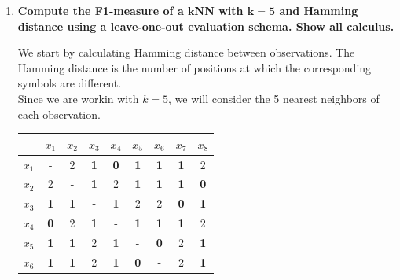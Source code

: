 \documentclass[12pt]{article}
\begin{document}
\vspace{10pt}
\begin{enumerate}[leftmargin=\labelsep]
    \item \textbf{Compute the F1-measure of a $\mathbf{k}$NN with $\mathbf{k =  5}$ and Hamming distance using a
    leave-one-out evaluation schema. Show all calculus.}

    \vspace{10pt}
    We start by calculating Hamming distance between observations. The Hamming distance is the number of positions at which the corresponding symbols are different.\\
    Since we are workin with $k = 5$, we will consider the 5 nearest neighbors of each observation.
    \vspace{10pt}
    
    \begin{table}[H]
        \begin{center}
            \begin{tabular}{c|cccccccc}
            & $x_1$ & $x_2$ & $x_3$ & $x_4$ & $x_5$ & $x_6$ & $x_7$ & $x_8$\\ 
            \hline
                $x_1$ & \-- & 2 & \textbf{\textcolor{codegreen}{1}} & \textbf{\textcolor{codegreen}{0}} & \textbf{\textcolor{codepink}{1}} & \textbf{\textcolor{codepink}{1}} & \textbf{\textcolor{codepink}{1}} & 2 \\ 
                $x_2$ & 2 & \-- & \textbf{\textcolor{codegreen}{1}} & 2 & \textbf{\textcolor{codepink}{1}} & \textbf{\textcolor{codepink}{1}} & \textbf{\textcolor{codepink}{1}} & \textbf{\textcolor{codepink}{0}} \\ 
                $x_3$ & \textbf{\textcolor{codegreen}{1}} & \textbf{\textcolor{codegreen}{1}} & \-- & \textbf{\textcolor{codegreen}{1}} & 2 & 2 & \textbf{\textcolor{codepink}{0}} & \textbf{\textcolor{codepink}{1}} \\ 
                $x_4$ & \textbf{\textcolor{codegreen}{0}} & 2 & \textbf{\textcolor{codegreen}{1}} & \-- & \textbf{\textcolor{codepink}{1}} & \textbf{\textcolor{codepink}{1}} & \textbf{\textcolor{codepink}{1}} & 2 \\ 
                $x_5$ & \textbf{\textcolor{codegreen}{1}} & \textbf{\textcolor{codegreen}{1}} & 2 & \textbf{\textcolor{codegreen}{1}} & \-- & \textbf{\textcolor{codepink}{0}} & 2 & \textbf{\textcolor{codepink}{1}} \\ 
                $x_6$ & \textbf{\textcolor{codegreen}{1}} & \textbf{\textcolor{codegreen}{1}} & 2 & \textbf{\textcolor{codegreen}{1}} & \textbf{\textcolor{codepink}{0}} & \-- & 2 & \textbf{\textcolor{codepink}{1}} \\ 

\end{tabular}
\end{center}
\end{table}
\end{enumerate}
\end{document}
